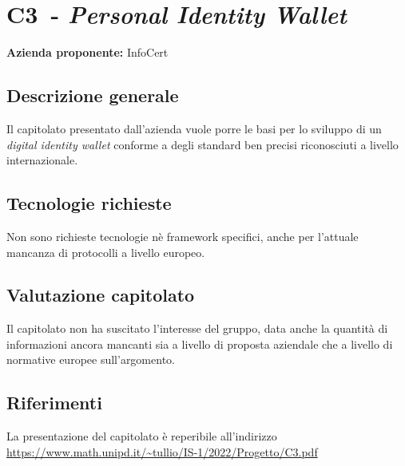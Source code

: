 
\renewcommand{\capName}{\textit{Personal Identity Wallet}} %
\renewcommand{\capCode}{C3} %
\renewcommand{\capLink}{https://www.math.unipd.it/~tullio/IS-1/2022/Progetto/C3.pdf} %
\renewcommand{\capProposer}{InfoCert} %


\section{\capCode\ - \capName}
\textbf{Azienda proponente:} InfoCert
\subsection{Descrizione generale}
Il capitolato presentato dall'azienda vuole porre le basi per lo sviluppo di un \textit{digital identity wallet} conforme a degli standard ben precisi riconosciuti a livello internazionale.

\subsection{Tecnologie richieste}
Non sono richieste tecnologie nè framework specifici, anche per l'attuale mancanza di protocolli a livello europeo.

\subsection{Valutazione capitolato}
Il capitolato non ha suscitato l'interesse del gruppo, data anche la quantità di informazioni ancora mancanti sia a livello di proposta aziendale che a livello di normative europee sull'argomento.

\subsection{Riferimenti}
La presentazione del capitolato è reperibile all'indirizzo \url{\capLink}